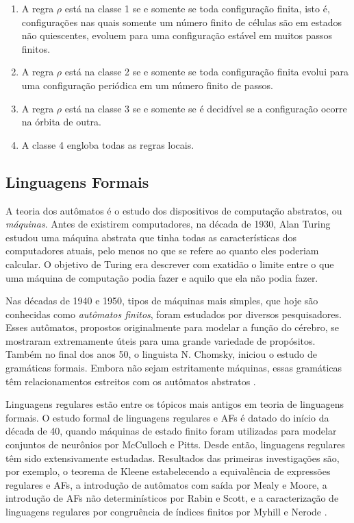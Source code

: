 \documentclass[12pt,a4paper]{article}
\begin{document}
\begin{enumerate}
\item A regra $\rho$ está na classe 1 se e somente se toda configuração finita,
isto é, configurações nas quais somente um número finito de células são em
estados não quiescentes, evoluem para uma configuração estável em muitos passos
finitos.

\item A regra $\rho$ está na classe 2 se e somente se toda configuração finita
evolui para uma configuração periódica em um número finito de passos.

\item A regra $\rho$ está na classe 3 se e somente se é decidível se a
configuração ocorre na órbita de outra.

\item A classe 4 engloba todas as regras locais.
\end{enumerate}

\subsection{Linguagens Formais}

A teoria dos autômatos é o estudo dos dispositivos de computação abstratos,
ou \textit{máquinas}. Antes de existirem computadores, na década de 1930, Alan
Turing estudou uma máquina abstrata que tinha todas as características dos
computadores atuais, pelo menos no que se refere ao quanto eles poderiam 
calcular. O objetivo de Turing era descrever com exatidão o limite entre
o que uma máquina de computação podia fazer e aquilo que ela não podia fazer.

Nas décadas de 1940 e 1950, tipos de máquinas mais simples, que hoje são
conhecidas como \textit{autômatos finitos}, foram estudados por diversos
pesquisadores. Esses autômatos, propostos originalmente para modelar a
função do cérebro, se mostraram extremamente úteis para uma grande variedade
de propósitos. Também no final dos anos 50, o linguista N. Chomsky, iniciou
o estudo de gramáticas formais. Embora não sejam estritamente máquinas,
essas gramáticas têm relacionamentos estreitos com os autômatos abstratos
.

Linguagens regulares estão entre os tópicos mais antigos em teoria de
linguagens formais. O estudo formal de linguagens regulares
e AFs é datado do início da década de 40, quando máquinas
de estado finito foram utilizadas para modelar conjuntos de neurônios
por McCulloch e Pitts. Desde então, linguagens regulares têm sido
extensivamente estudadas. Resultados das primeiras investigações são,
por exemplo, o teorema de Kleene estabelecendo a equivalência de
expressões regulares e AFs, a introdução de autômatos
com saída por Mealy e Moore, a introdução de AFs não
determinísticos por Rabin e Scott, e a caracterização de linguagens
regulares por congruência de índices finitos por Myhill e Nerode
.
\end{document}
